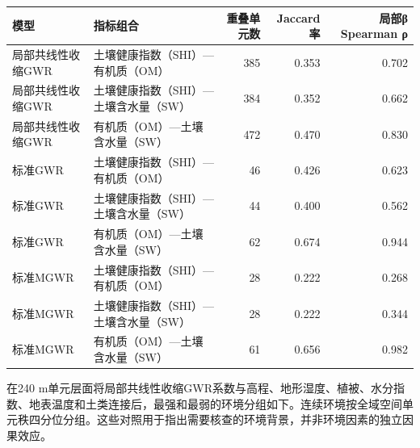 \documentclass[
  a4paper,
  12pt]{ctexart}
\begin{document}
\begin{longtable}[]{@{}llrrr@{}}
\toprule
模型 & 指标组合 & 重叠单元数 & Jaccard率 & 局部β Spearman ρ \\
\midrule
\endhead
局部共线性收缩GWR & 土壤健康指数（SHI）---有机质（OM） & 385 & 0.353 &
0.702 \\
局部共线性收缩GWR & 土壤健康指数（SHI）---土壤含水量（SW） & 384 & 0.352
& 0.662 \\
局部共线性收缩GWR & 有机质（OM）---土壤含水量（SW） & 472 & 0.470 &
0.830 \\
标准GWR & 土壤健康指数（SHI）---有机质（OM） & 46 & 0.426 & 0.623 \\
标准GWR & 土壤健康指数（SHI）---土壤含水量（SW） & 44 & 0.400 & 0.562 \\
标准GWR & 有机质（OM）---土壤含水量（SW） & 62 & 0.674 & 0.944 \\
标准MGWR & 土壤健康指数（SHI）---有机质（OM） & 28 & 0.222 & 0.268 \\
标准MGWR & 土壤健康指数（SHI）---土壤含水量（SW） & 28 & 0.222 &
0.344 \\
标准MGWR & 有机质（OM）---土壤含水量（SW） & 61 & 0.656 & 0.982 \\
\bottomrule
\end{longtable}

在240
m单元层面将局部共线性收缩GWR系数与高程、地形湿度、植被、水分指数、地表温度和土类连接后，最强和最弱的环境分组如下。连续环境按全域空间单元秩四分位分组。这些对照用于指出需要核查的环境背景，并非环境因素的独立因果效应。
\end{document}
